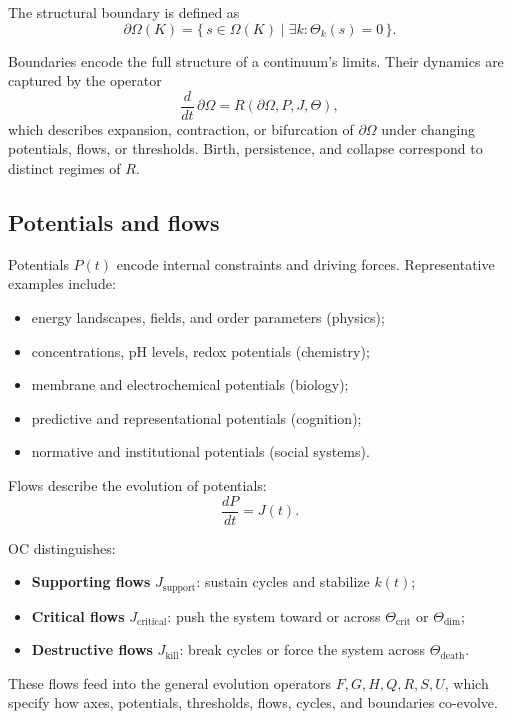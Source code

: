 The structural boundary is defined as
\[
\partial\Omega(K) = \{\, s\in\Omega(K) \mid \exists k: \Theta_k(s)=0 \,\}.
\]

Boundaries encode the full structure of a continuum’s limits.  
Their dynamics are captured by the operator
\[
\frac{d}{dt}\,\partial\Omega = R(\partial\Omega, P, J, \Theta),
\]
which describes expansion, contraction, or bifurcation of \(\partial\Omega\) under changing potentials, flows, or thresholds.  
Birth, persistence, and collapse correspond to distinct regimes of \(R\).

\subsection{Potentials and flows}

Potentials \(P(t)\) encode internal constraints and driving forces.  
Representative examples include:

\begin{itemize}
    \item energy landscapes, fields, and order parameters (physics);
    \item concentrations, pH levels, redox potentials (chemistry);
    \item membrane and electrochemical potentials (biology);
    \item predictive and representational potentials (cognition);
    \item normative and institutional potentials (social systems).
\end{itemize}

Flows describe the evolution of potentials:
\[
\frac{dP}{dt} = J(t).
\]

OC distinguishes:

\begin{itemize}
    \item \textbf{Supporting flows} \(J_{\mathrm{support}}\): sustain cycles and stabilize \(k(t)\);
    \item \textbf{Critical flows} \(J_{\mathrm{critical}}\): push the system toward or across \(\Theta_{\mathrm{crit}}\) or \(\Theta_{\mathrm{dim}}\);
    \item \textbf{Destructive flows} \(J_{\mathrm{kill}}\): break cycles or force the system across \(\Theta_{\mathrm{death}}\).
\end{itemize}

These flows feed into the general evolution operators \(F, G, H, Q, R, S, U\), which specify how axes, potentials, thresholds, flows, cycles, and boundaries co-evolve.

